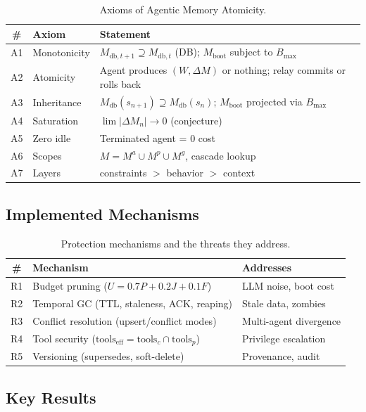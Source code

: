 \documentclass{article}
\begin{document}
\begin{table}[h]
\centering
\caption{Axioms of Agentic Memory Atomicity.}
\begin{tabular}{@{}cll@{}}
\toprule
\textbf{\#} & \textbf{Axiom} & \textbf{Statement} \\
\midrule
A1 & Monotonicity & $M_{\text{db},t+1} \supseteq M_{\text{db},t}$ (DB); $M_{\text{boot}}$ subject to $B_{\max}$ \\
A2 & Atomicity & Agent produces $(W, \Delta M)$ or nothing; relay commits or rolls back \\
A3 & Inheritance & $M_{\text{db}}(s_{n+1}) \supseteq M_{\text{db}}(s_n)$; $M_{\text{boot}}$ projected via $B_{\max}$ \\
A4 & Saturation & $\lim |\Delta M_n| \to 0$ (conjecture) \\
A5 & Zero idle & Terminated agent = 0 cost \\
A6 & Scopes & $M = M^{a} \cup M^{p} \cup M^{g}$, cascade lookup \\
A7 & Layers & constraints $>$ behavior $>$ context \\
\bottomrule
\end{tabular}
\end{table}

\subsection{Implemented Mechanisms}

\begin{table}[h]
\centering
\caption{Protection mechanisms and the threats they address.}
\begin{tabular}{@{}cll@{}}
\toprule
\textbf{\#} & \textbf{Mechanism} & \textbf{Addresses} \\
\midrule
R1 & Budget pruning ($U = 0.7P + 0.2J + 0.1F$) & LLM noise, boot cost \\
R2 & Temporal GC (TTL, staleness, ACK, reaping) & Stale data, zombies \\
R3 & Conflict resolution (upsert/conflict modes) & Multi-agent divergence \\
R4 & Tool security ($\text{tools}_{\text{eff}} = \text{tools}_c \cap \text{tools}_p$) & Privilege escalation \\
R5 & Versioning (supersedes, soft-delete) & Provenance, audit \\
\bottomrule
\end{tabular}
\end{table}

\subsection{Key Results}
\end{document}
